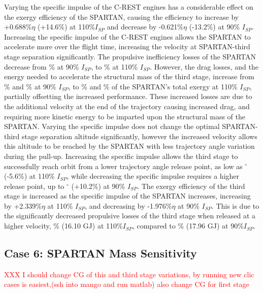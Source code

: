 Varying the specific impulse of the C-REST engines has a considerable effect on the exergy efficiency of the SPARTAN, causing the efficiency to increase by +0.688\%$\eta$ (+14.6\%) at 110\%$I_{SP}$ and decrease by -0.621\%$\eta$ (-13.2\%) at 90\% $I_{SP}$. 
Increasing the specific impulse of the C-REST engines allows the SPARTAN to accelerate more over the flight time, increasing the velocity at SPARTAN-third stage separation significantly. The propulsive inefficiency losses of the SPARTAN decrease from \PlosssecondCombinedIspNinetyNoReturn\% at 90\% $I_{SP}$, to \PlosssecondCombinedIspOneHundredTenNoReturn \% at 110\% $I_{SP}$. However, the drag losses, and the energy needed to accelerate the structural mass of the third stage, increase from \WDsecondIspNinetyNoReturn\% and \WsecondIspNinetyNoReturn\% at 90\% $I_{SP}$, to \WDsecondIspOneHundredTenNoReturn\% and \WsecondIspOneHundredTenNoReturn\% of the SPARTAN's total exergy at 110\% $I_{SP}$, partially offsetting the increased performance. These increased losses are due to the additional velocity at the end of the trajectory causing increased drag, and requiring more kinetic energy to be imparted upon the structural mass of the SPARTAN. 
 Varying the specific impulse does not change the optimal SPARTAN-third stage separation altitude significantly, however the increased velocity allows this altitude to be reached by the SPARTAN with less trajectory angle variation during the pull-up. Increasing the specific impulse allows the third stage to successfully reach orbit from a lower trajectory angle release point, as low as \secondthirdSeparationgammaIspOneHundredTenNoReturn$^\circ$ (-5.6\%) at 110\% $I_{SP}$, while decreasing the specific impulse requires a higher release point, up to \secondthirdSeparationgammaIspNinetyNoReturn$^\circ$ (+10.2\%) at 90\% $I_{SP}$.
The exergy efficiency of the third stage is increased as the specific impulse of the SPARTAN increases, increasing by +2.339\%$\eta$ at 110\% $I_{SP}$, and decreasing by -1.976\%$\eta$ at 90\% $I_{SP}$. This is due to the significantly decreased propulsive losses of the third stage when released at a higher velocity, \PlossthreeCombinedIspOneHundredTenNoReturn\% (16.10 GJ) at 110\%$I_{SP}$, compared to \PlossthreeCombinedIspNinetyNoReturn\% (17.96 GJ) at 90\%$I_{SP}$. 

\subsection{Case 6: SPARTAN Mass Sensitivity}\label{sec:SpartanMassnoreturn}
\textcolor{red}{XXX I should change CG of this and third stage variations, by running new clic cases is easiest,(ssh into mango and run matlab) also change CG for first stage}

